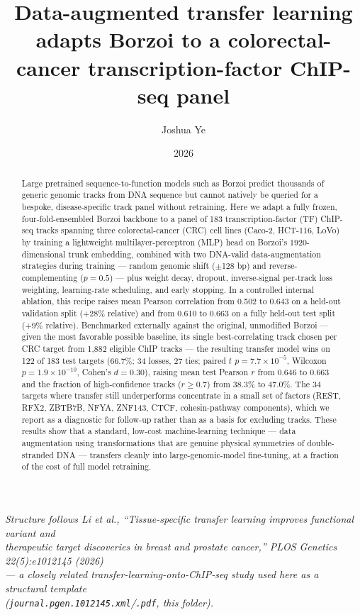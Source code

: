\documentclass[10pt]{article}
\title{\textbf{Data-augmented transfer learning adapts Borzoi to a colorectal-cancer transcription-factor ChIP-seq panel}}
\author[1]{Joshua Ye}
\affil[1]{}
\date{2026}
\begin{document}
\maketitle

\begin{center}
\small\textit{Structure follows Li \textit{et al.}, ``Tissue-specific transfer learning improves functional variant and\\
therapeutic target discoveries in breast and prostate cancer,'' \textit{PLOS Genetics} 22(5):e1012145 (2026)\\
--- a closely related transfer-learning-onto-ChIP-seq study used here as a structural template\\
(\texttt{journal.pgen.1012145.xml}/\texttt{.pdf}, this folder).}
\end{center}

\vspace{1em}

\begin{abstract}
\noindent
Large pretrained sequence-to-function models such as Borzoi predict thousands of generic genomic tracks from DNA sequence but cannot natively be queried for a bespoke, disease-specific track panel without retraining. Here we adapt a fully frozen, four-fold-ensembled Borzoi backbone to a panel of 183 transcription-factor (TF) ChIP-seq tracks spanning three colorectal-cancer (CRC) cell lines (Caco-2, HCT-116, LoVo) by training a lightweight multilayer-perceptron (MLP) head on Borzoi's 1920-dimensional trunk embedding, combined with two DNA-valid data-augmentation strategies during training --- random genomic shift ($\pm$128 bp) and reverse-complementing ($p = 0.5$) --- plus weight decay, dropout, inverse-signal per-track loss weighting, learning-rate scheduling, and early stopping. In a controlled internal ablation, this recipe raises mean Pearson correlation from 0.502 to 0.643 on a held-out validation split (+28\% relative) and from 0.610 to 0.663 on a fully held-out test split (+9\% relative). Benchmarked externally against the original, unmodified Borzoi --- given the most favorable possible baseline, its single best-correlating track chosen per CRC target from 1,882 eligible ChIP tracks --- the resulting transfer model wins on 122 of 183 test targets (66.7\%; 34 losses, 27 ties; paired $t$ $p = 7.7\times10^{-5}$, Wilcoxon $p = 1.9\times10^{-10}$, Cohen's $d = 0.30$), raising mean test Pearson $r$ from 0.646 to 0.663 and the fraction of high-confidence tracks ($r \geq 0.7$) from 38.3\% to 47.0\%. The 34 targets where transfer still underperforms concentrate in a small set of factors (REST, RFX2, ZBTB7B, NFYA, ZNF143, CTCF, cohesin-pathway components), which we report as a diagnostic for follow-up rather than as a basis for excluding tracks. These results show that a standard, low-cost machine-learning technique --- data augmentation using transformations that are genuine physical symmetries of double-stranded DNA --- transfers cleanly into large-genomic-model fine-tuning, at a fraction of the cost of full model retraining.
\end{abstract}
\end{document}

